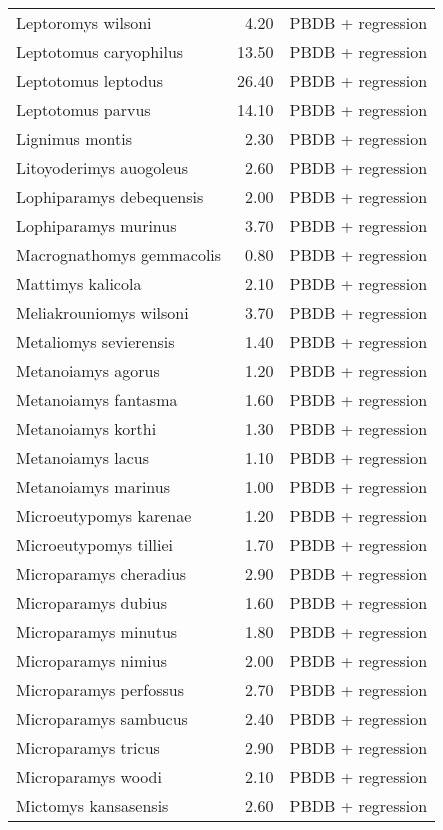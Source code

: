 \begin{table}[ht]
\begin{tabular}{lrl}
  Leptoromys wilsoni & 4.20 & PBDB + regression \\ 
  Leptotomus caryophilus & 13.50 & PBDB + regression \\ 
  Leptotomus leptodus & 26.40 & PBDB + regression \\ 
  Leptotomus parvus & 14.10 & PBDB + regression \\ 
  Lignimus montis & 2.30 & PBDB + regression \\ 
  Litoyoderimys auogoleus & 2.60 & PBDB + regression \\ 
  Lophiparamys debequensis & 2.00 & PBDB + regression \\ 
  Lophiparamys murinus & 3.70 & PBDB + regression \\ 
  Macrognathomys gemmacolis & 0.80 & PBDB + regression \\ 
  Mattimys kalicola & 2.10 & PBDB + regression \\ 
  Meliakrouniomys wilsoni & 3.70 & PBDB + regression \\ 
  Metaliomys sevierensis & 1.40 & PBDB + regression \\ 
  Metanoiamys agorus & 1.20 & PBDB + regression \\ 
  Metanoiamys fantasma & 1.60 & PBDB + regression \\ 
  Metanoiamys korthi & 1.30 & PBDB + regression \\ 
  Metanoiamys lacus & 1.10 & PBDB + regression \\ 
  Metanoiamys marinus & 1.00 & PBDB + regression \\ 
  Microeutypomys karenae & 1.20 & PBDB + regression \\ 
  Microeutypomys tilliei & 1.70 & PBDB + regression \\ 
  Microparamys cheradius & 2.90 & PBDB + regression \\ 
  Microparamys dubius & 1.60 & PBDB + regression \\ 
  Microparamys minutus & 1.80 & PBDB + regression \\ 
  Microparamys nimius & 2.00 & PBDB + regression \\ 
  Microparamys perfossus & 2.70 & PBDB + regression \\ 
  Microparamys sambucus & 2.40 & PBDB + regression \\ 
  Microparamys tricus & 2.90 & PBDB + regression \\ 
  Microparamys woodi & 2.10 & PBDB + regression \\ 
  Mictomys kansasensis & 2.60 & PBDB + regression \\ 

\end{tabular}
\end{table}

